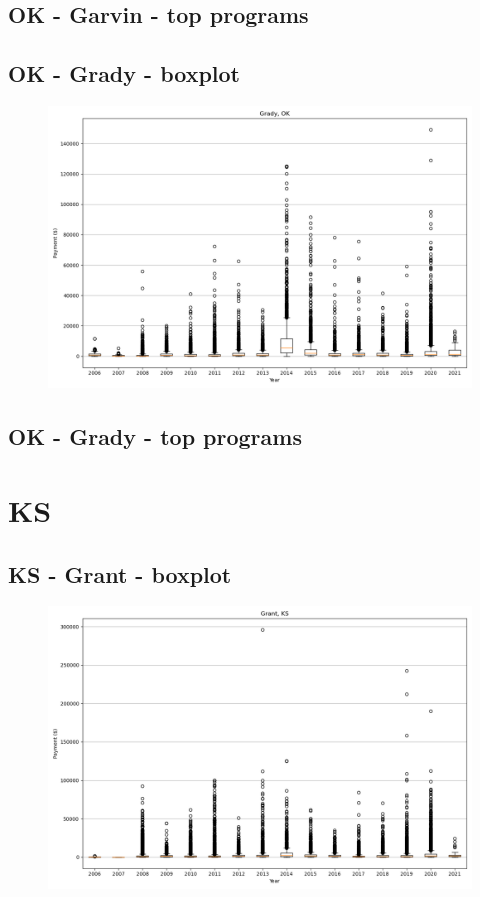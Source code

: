 \subsection*{OK - Garvin - top programs}

\newpage
\subsection*{OK - Grady - boxplot}
\begin{figure}[h]
\centering
\includegraphics[width=7in]{../output/boxplots/counties/Grady-OK_boxplot.png}
\end{figure}


\subsection*{OK - Grady - top programs}

\newpage
\section*{KS}
\subsection*{KS - Grant - boxplot}
\begin{figure}[h]
\centering
\includegraphics[width=7in]{../output/boxplots/counties/Grant-KS_boxplot.png}
\end{figure}


